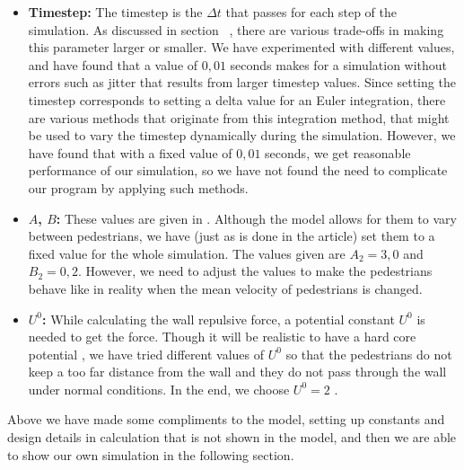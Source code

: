 \begin{itemize}
    \item \textbf{Timestep:} The timestep is the $\Delta t$ that passes for 
        each step of the simulation. As discussed in 
        section~ %
		, there are various trade-offs in making 
        this parameter larger or smaller. We have experimented with different 
        values, and have found that a value of $0,01$ seconds makes for a 
        simulation without errors such as jitter that results from larger 
        timestep values. Since setting the timestep corresponds to setting a 
        delta value for an Euler integration, there are various methods that 
        originate from this integration method, that might be used to vary the 
        timestep dynamically during the simulation. 
         However, we have found 
        that with a fixed value of $0,01$ seconds, we get reasonable 
        performance of our simulation, so we have not found the need to 
        complicate our program by applying such methods.

    \item \textbf{$A$, $B$:} These values are given in \cite{ABconstant}. 
        Although the model allows for them to vary between pedestrians, we have 
        (just as is done in the article) set them to a fixed value for the 
        whole simulation. The values given are $A_2=3,0$ and $B_2 = 0,2$. However, 
        we need to adjust the values to make the pedestrians behave like in reality 
        when the mean velocity of pedestrians is changed.

    \item \textbf{$ U^{0} $:} While calculating the wall repulsive force, a potential
        constant $ U^{0} $ is needed to get the force. Though it will be realistic to 
        have a hard core potential \cite{self-org}, we have tried different values 
        of $ U^{0} $ so that the pedestrians do not keep a too far distance from the wall 
        and they do not pass through the wall under normal conditions. In the end, 
        we choose $ U^{0} =2 $ .
 
\end{itemize}

Above we have made some compliments to the model, setting up constants and 
design details in calculation that is not shown in the model, and then we are able to  
show our own simulation in the following section.